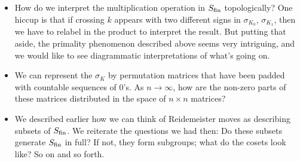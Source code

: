 \begin{itemize}
  \item How do we interpret the multiplication operation in $S_{\rm
    fin}$ topologically? One hiccup is that if crossing $k$ appears
    with two different signs in $\sigma_{K_0}$, $\sigma_{K_1}$, then
    we have to relabel in the product to interpret the result. But
    putting that aside, the primality phenomenon described above seems
    very intriguing, and we would like to see diagrammatic
    interpretations of what's going on.
  \item We can represent the $\sigma_K$ by permutation matrices that
    have been padded with countable sequences of $0$'s. As $n \to
    \infty$, how are the non-zero parts of these matrices distributed
    in the space of $n\times n$ matrices?
  \item We described earlier how we can think of Reidemeister moves as
    describing subsets of $S_{\rm fin}$. We reiterate the questions we
    had then: Do these subsets generate $S_{\rm fin}$ in full? If not,
    they form subgroups; what do the cosets look like? So on and so
    forth.
\end{itemize}






















